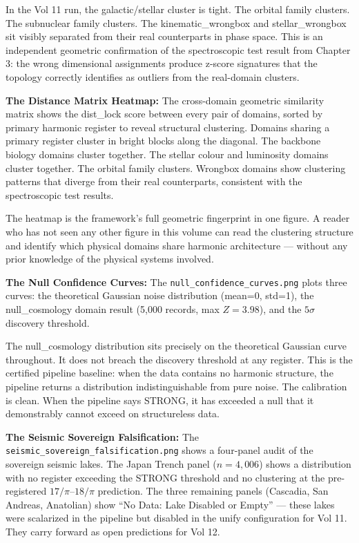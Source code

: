 \documentclass[11pt, letterpaper, openany]{book}
\begin{document}
\begin{empiricalbox}
In the Vol 11 run, the galactic/stellar cluster is tight. The orbital family
clusters. The subnuclear family clusters. The kinematic\_wrongbox and
stellar\_wrongbox sit visibly separated from their real counterparts in
phase space. This is an independent geometric confirmation of the
spectroscopic test result from Chapter 3: the wrong dimensional assignments
produce z-score signatures that the topology correctly identifies as outliers
from the real-domain clusters.

\textbf{The Distance Matrix Heatmap:}
The cross-domain geometric similarity matrix shows the dist\_lock score
between every pair of domains, sorted by primary harmonic register to reveal
structural clustering. Domains sharing a primary register cluster in bright
blocks along the diagonal. The backbone biology domains cluster together.
The stellar colour and luminosity domains cluster together. The orbital family
clusters. Wrongbox domains show clustering patterns that diverge from their
real counterparts, consistent with the spectroscopic test results.

The heatmap is the framework's full geometric fingerprint in one figure. A
reader who has not seen any other figure in this volume can read the clustering
structure and identify which physical domains share harmonic architecture ---
without any prior knowledge of the physical systems involved.

\textbf{The Null Confidence Curves:}
The \texttt{null\_confidence\_curves.png} plots three curves: the theoretical
Gaussian noise distribution (mean=0, std=1), the null\_cosmology domain result
(5,000 records, max $Z = 3.98$), and the $5\sigma$ discovery threshold.

The null\_cosmology distribution sits precisely on the theoretical Gaussian
curve throughout. It does not breach the discovery threshold at any register.
This is the certified pipeline baseline: when the data contains no harmonic
structure, the pipeline returns a distribution indistinguishable from pure
noise. The calibration is clean. When the pipeline says STRONG, it has
exceeded a null that it demonstrably cannot exceed on structureless data.

\textbf{The Seismic Sovereign Falsification:}
The \texttt{seismic\_sovereign\_falsification.png} shows a four-panel audit
of the sovereign seismic lakes. The Japan Trench panel ($n=4{,}006$) shows
a distribution with no register exceeding the STRONG threshold and no
clustering at the pre-registered $17/\pi$--$18/\pi$ prediction. The three
remaining panels (Cascadia, San Andreas, Anatolian) show ``No Data: Lake
Disabled or Empty'' --- these lakes were scalarized in the pipeline but
disabled in the unify configuration for Vol 11. They carry forward as
open predictions for Vol 12.


\end{empiricalbox}
\end{document}
